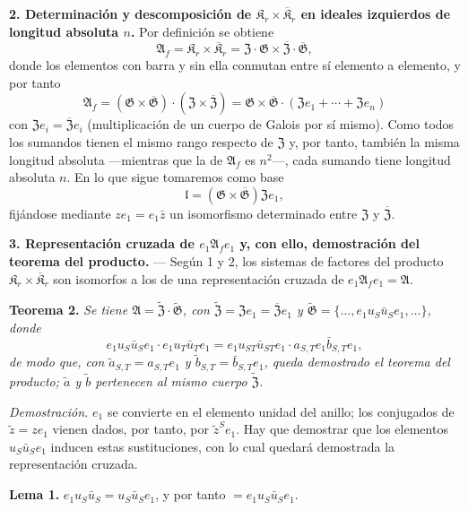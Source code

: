 \noindent\textbf{2. Determinación y descomposición de \(\mathfrak K_r\times\overline{\mathfrak K}_r\) en ideales izquierdos de longitud absoluta \(n\).} Por definición se obtiene
\[
\mathfrak A_f=\mathfrak K_r\times\overline{\mathfrak K}_r
=\mathfrak Z\cdot\mathfrak G\times\overline{\mathfrak Z}\cdot\overline{\mathfrak G},
\]
donde los elementos con barra y sin ella conmutan entre sí elemento a elemento, y por tanto
\[
\mathfrak A_f
=(\mathfrak G\times\overline{\mathfrak G})\cdot(\mathfrak Z\times\overline{\mathfrak Z})
=\mathfrak G\times\overline{\mathfrak G}\cdot(\mathfrak Ze_1+\cdots+\mathfrak Ze_n)
\]
con \(\mathfrak Ze_i=\overline{\mathfrak Z}e_i\) (multiplicación de un cuerpo de Galois por sí mismo). Como todos los sumandos tienen el mismo rango respecto de \(\mathfrak Z\) y, por tanto, también la misma longitud absoluta ---mientras que la de \(\mathfrak A_f\) es \(n^2\)---, cada sumando tiene longitud absoluta \(n\). En lo que sigue tomaremos como base
\[
\mathfrak l=(\mathfrak G\times\overline{\mathfrak G})\mathfrak Ze_1,
\]
fijándose mediante \(ze_1=e_1\bar z\) un isomorfismo determinado entre \(\mathfrak Z\) y \(\overline{\mathfrak Z}\).

\noindent\textbf{3. Representación cruzada de \(e_1\mathfrak A_fe_1\) y, con ello, demostración del teorema del producto.} --- Según 1 y 2, los sistemas de factores del producto \(\mathfrak K_r\times\overline{\mathfrak K}_r\) son isomorfos a los de una representación cruzada de \(e_1\mathfrak A_fe_1=\mathfrak A\).

\noindent\textbf{Teorema 2.} \emph{Se tiene \(\mathfrak A=\widetilde{\mathfrak Z}\cdot\widetilde{\mathfrak G}\), con \(\widetilde{\mathfrak Z}=\mathfrak Ze_1=\overline{\mathfrak Z}e_1\) y \(\widetilde{\mathfrak G}=\{\ldots,e_1u_S\bar u_Se_1,\ldots\}\), donde
\[
e_1u_S\bar u_Se_1\cdot e_1u_T\bar u_Te_1
=e_1u_{ST}\bar u_{ST}e_1\cdot a_{S,T}e_1\bar b_{S,T}e_1,
\]
de modo que, con \(\tilde a_{S,T}=a_{S,T}e_1\) y \(\tilde b_{S,T}=\bar b_{S,T}e_1\), queda demostrado el teorema del producto; \(\tilde a\) y \(\tilde b\) pertenecen al mismo cuerpo \(\widetilde{\mathfrak Z}\).}

\noindent\emph{Demostración.} \(e_1\) se convierte en el elemento unidad del anillo; los conjugados de \(\tilde z=ze_1\) vienen dados, por tanto, por \(\tilde z^Se_1\). Hay que demostrar que los elementos \(u_S\bar u_Se_1\) inducen estas sustituciones, con lo cual quedará demostrada la representación cruzada.

\noindent\textbf{Lema 1.} \(e_1u_S\bar u_S=u_S\bar u_Se_1\), y por tanto \(=e_1u_S\bar u_Se_1\).


